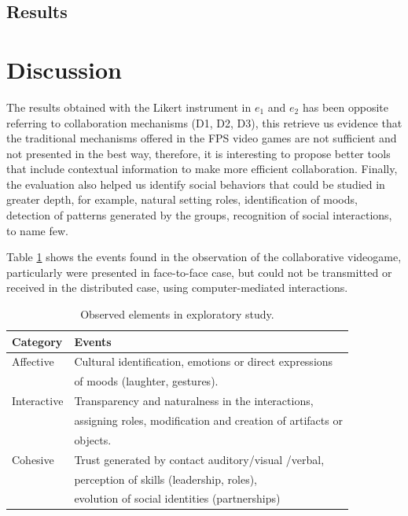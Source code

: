 \documentclass{./sty/llncs}
\begin{document}
\subsection{Results}
\label{sec:results}

\section{Discussion}
\label{sec:discussion}
The results obtained with the Likert instrument in $e_1$ and $e_2$ has been opposite referring to collaboration mechanisms (D1, D2, D3), this retrieve us evidence that the traditional mechanisms offered in the FPS video games are not sufficient and not presented in the best way, therefore, it is interesting to propose better tools that include contextual information to make more efficient collaboration. Finally, the evaluation also helped us identify social behaviors that could be studied in greater depth, for example, natural setting roles, identification of moods, detection of patterns generated by the groups, recognition of social interactions, to name few.

Table \ref{tab:faceToFaceIndicators} shows the events found in the observation of the collaborative videogame, particularly were presented in face-to-face case, but could not be transmitted or received in the distributed case, using computer-mediated interactions.

\begin{table}[htbp]
	\centering
	\begin{tabular}{ll}
			\hline
		 	Category & Events \\
			\hline
			 Affective & Cultural identification, emotions or direct expressions \\
			 & of moods (laughter, gestures). \\
			 Interactive & Transparency and naturalness in the interactions, \\
			 & assigning roles, modification and creation of artifacts or \\
			 & objects. \\
			 Cohesive & Trust generated by contact auditory/visual /verbal, \\
			 & perception of skills (leadership, roles), \\
		   & evolution of social identities (partnerships) \\
			\hline	 
	\end{tabular}
	\caption{Observed elements in exploratory study.}
	\label{tab:faceToFaceIndicators}
\end{table}
\end{document}
